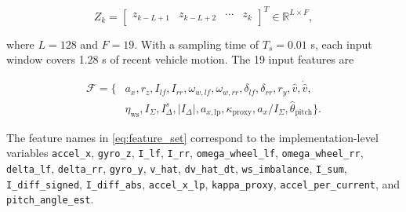 \documentclass{ieeeaccess}
\begin{document}
\begin{equation}
Z_k =
\begin{bmatrix}
z_{k-L+1} & z_{k-L+2} & \cdots & z_k
\end{bmatrix}^{T}
\in \mathbb{R}^{L \times F},
\label{eq:input_window}
\end{equation}

where $L=128$ and $F=19$. With a sampling time of $T_s=0.01$ s, each input window covers 1.28 s of recent vehicle motion. The 19 input features are

\begin{equation}
\begin{aligned}
\mathcal{F}=\{&
a_x, r_z, I_{lf}, I_{rr}, \omega_{w,lf}, \omega_{w,rr},
\delta_{lf}, \delta_{rr}, r_y, \hat{v}, \dot{\hat{v}},\\
& \eta_{\mathrm{ws}}, I_{\Sigma}, I_{\Delta}^{s}, |I_{\Delta}|,
a_{x,\mathrm{lp}}, \kappa_{\mathrm{proxy}},
a_x/I_{\Sigma}, \hat{\theta}_{\mathrm{pitch}}\}.
\end{aligned}
\label{eq:feature_set}
\end{equation}

The feature names in \eqref{eq:feature_set} correspond to the implementation-level variables \texttt{accel\_x}, \texttt{gyro\_z}, \texttt{I\_lf}, \texttt{I\_rr}, \texttt{omega\_wheel\_lf}, \texttt{omega\_wheel\_rr}, \texttt{delta\_lf}, \texttt{delta\_rr}, \texttt{gyro\_y}, \texttt{v\_hat}, \texttt{dv\_hat\_dt}, \texttt{ws\_imbalance}, \texttt{I\_sum}, \texttt{I\_diff\_signed}, \texttt{I\_diff\_abs}, \texttt{accel\_x\_lp}, \texttt{kappa\_proxy}, \texttt{accel\_per\_current}, and \texttt{pitch\_angle\_est}.
\end{document}
